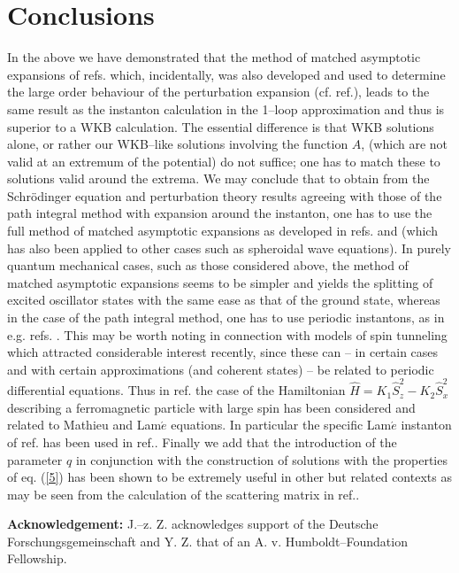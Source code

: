 \documentclass[a4paper,12pt,a4]{article}
\begin{document}
\section{Conclusions}
In the above we have demonstrated that
 the method of matched
asymptotic expansions of refs. \cite{7,9,10}
which, incidentally, was also developed and used to
determine the large order behaviour of the
perturbation expansion (cf. ref.\cite{13}),
 leads to the same result as the instanton
calculation in the 1--loop
approximation and thus is superior to a WKB
calculation.  The essential difference is
that WKB solutions alone,
or rather our WKB--like solutions involving the
function $A$, (which are not valid
at an extremum of the potential) do not suffice;
one has to match these to
solutions valid around the extrema.  
We may conclude that to obtain from the
Schr\"odinger equation and perturbation theory
 results agreeing with those of
the path integral method with expansion around the
instanton, one has to use the full 
method of matched asymptotic expansions
as developed in refs.\cite{9} and \cite{7,10}
(which has also been applied to other cases
such as spheroidal wave equations\cite{14}).
In purely quantum mechanical cases, such as those considered
above, the method of matched asymptotic 
expansions seems to be simpler and yields the
splitting of excited oscillator states with the same ease as 
that of the ground state, whereas in the case of the
path integral method, one has to use periodic instantons, as
 in e.g. refs. \cite{12,15}.
This may be worth noting in connection with
models of spin tunneling which attracted considerable interest
recently, since these can -- in certain cases and with
certain approximations (and coherent states)
-- be related to periodic differential equations.
Thus in ref.\cite{5} the case of the Hamiltonian
${\hat H} = K_1{\hat S}^2_z - K_2{\hat S}^2_x$
describing a ferromagnetic particle with large spin
has been considered and related to Mathieu and Lam${\acute e}$
equations. 
In particular the specific Lam${\acute e}$ instanton
of ref. \cite{1} has been used in ref.\cite{16}.
Finally we add that the introduction of the
parameter $q$ in conjunction with the construction of
solutions with the properties of eq. (\ref{5})
has been shown to be extremely useful in other
but related contexts as may be seen from the
calculation of the scattering matrix in ref.\cite{17}.

\vspace{1cm}


\noindent
{\bf Acknowledgement:} 
J.--z. Z. acknowledges support of the Deutsche Forschungsgemeinschaft
and Y. Z. that of an A. v. Humboldt--Foundation Fellowship.
\end{document}
